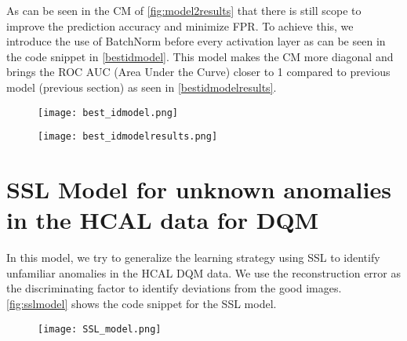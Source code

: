 As can be seen in the CM of \autoref{fig:model2results}  that there is still scope to improve the prediction accuracy and minimize FPR.
  To achieve this, we introduce the use of BatchNorm before every activation layer as can be seen in the code snippet in \autoref{bestidmodel}.
  This model makes the CM more diagonal and brings the ROC AUC (Area Under the Curve) closer to 1 compared to previous model (previous section) as seen in \autoref{bestidmodelresults}.


\begin{figure}
\texttt{[image: best\_idmodel.png]}
\caption{\label{bestidmodel}}
\end{figure}


\begin{figure}
\texttt{[image: best\_idmodelresults.png]}
\caption{\label{bestidmodelresults}}
\end{figure}

\section{SSL Model for unknown anomalies in the HCAL data for DQM}

In this model, we try to generalize the learning strategy using SSL to identify unfamiliar anomalies in the HCAL DQM data. We use the reconstruction error as the discriminating factor to identify deviations from the good images. \autoref{fig:sslmodel} shows the code snippet for the SSL model.

\begin{figure}
\texttt{[image: SSL\_model.png]}
\caption{\label{fig:sslmodel}}
\end{figure}